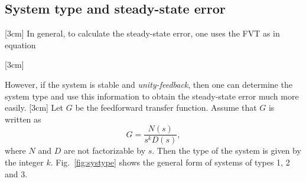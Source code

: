 \documentclass{scrreprt}
\theoremstyle{plain}
\theoremstyle{definition}
\theoremstyle{remark}
\begin{document}
\subsection{System type and steady-state error}

 [3cm]
In general, to calculate the steady-state error, one uses the FVT as
in equation~ %

\reversemarginpar
{}[3cm]

 However, if the system is stable and
\emph{unity-feedback}, then one can determine the system type and use
this information to obtain the steady-state error much more easily. 
\reversemarginpar
{}[3cm]
Let $G$ be the feedforward transfer function. Assume that $G$ is
written as
\[
G=\frac{N(s)}{s^kD(s)},
\]
where $N$ and $D$ are not factorizable by $s$. Then the type of the
system is given by the integer $k$. Fig.~\ref{fig:systype} shows the
general form of systems of types 1, 2 and 3.
\end{document}
